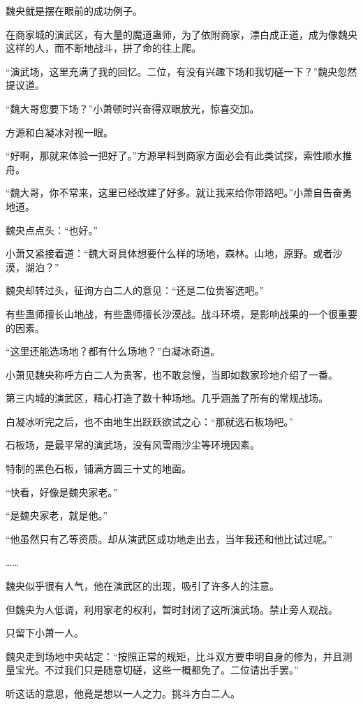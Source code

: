 \begin{this_body}
魏央就是摆在眼前的成功例子。

在商家城的演武区，有大量的魔道蛊师，为了依附商家，漂白成正道，成为像魏央这样的人，而不断地战斗，拼了命的往上爬。

“演武场，这里充满了我的回忆。二位，有没有兴趣下场和我切磋一下？”魏央忽然提议道。

“魏大哥您要下场？”小萧顿时兴奋得双眼放光，惊喜交加。

方源和白凝冰对视一眼。

“好啊，那就来体验一把好了。”方源早料到商家方面必会有此类试探，索性顺水推舟。

“魏大哥，你不常来，这里已经改建了好多。就让我来给你带路吧。”小萧自告奋勇地道。

魏央点点头：“也好。”

小萧又紧接着道：“魏大哥具体想要什么样的场地，森林。山地，原野。或者沙漠，湖泊？”

魏央却转过头，征询方白二人的意见：“还是二位贵客选吧。”

有些蛊师擅长山地战，有些蛊师擅长沙漠战。战斗环境，是影响战果的一个很重要的因素。

“这里还能选场地？都有什么场地？”白凝冰奇道。

小萧见魏央称呼方白二人为贵客，也不敢怠慢，当即如数家珍地介绍了一番。

第三内城的演武区，精心打造了数十种场地。几乎涵盖了所有的常规战场。

白凝冰听完之后，也不由地生出跃跃欲试之心：“那就选石板场吧。”

石板场，是最平常的演武场，没有风雪雨沙尘等环境因素。

特制的黑色石板，铺满方圆三十丈的地面。

“快看，好像是魏央家老。”

“是魏央家老，就是他。”

“他虽然只有乙等资质。却从演武区成功地走出去，当年我还和他比试过呢。”

……

魏央似乎很有人气，他在演武区的出现，吸引了许多人的注意。

但魏央为人低调，利用家老的权利，暂时封闭了这所演武场。禁止旁人观战。

只留下小萧一人。

魏央走到场地中央站定：“按照正常的规矩，比斗双方要申明自身的修为，并且测量宝光。不过我们只是随意切磋，这些一概都免了。二位请出手罢。”

听这话的意思，他竟是想以一人之力。挑斗方白二人。


\end{this_body}

